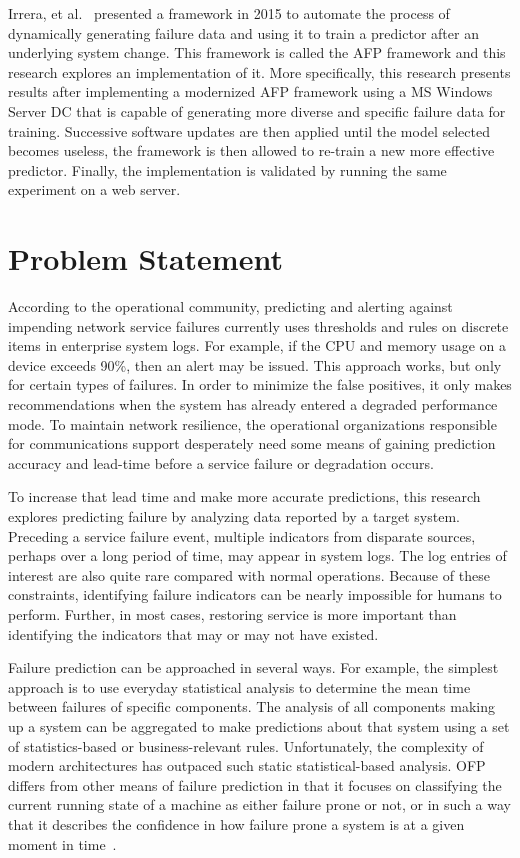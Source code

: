 Irrera, et al.~\cite{irrera2015} presented a framework in 2015 to automate the
process of dynamically generating failure data and using it to train a
predictor after an underlying system change.  This framework is called the
\ac{AFP} framework and this research explores an implementation of it.  More
specifically, this research presents results after implementing a modernized
\ac{AFP} framework using a \ac{MS} Windows Server \ac{DC} that is capable of
generating more diverse and specific failure data for training.  Successive
software updates are then applied until the model selected becomes useless, the
framework is then allowed to re-train a new more effective predictor.  Finally,
the implementation is validated by running the same experiment on a web server.

\section{Problem Statement}
According to the operational community, predicting and alerting against
impending network service failures currently uses thresholds and rules on
discrete items in enterprise system logs.  For example, if the \ac{CPU} and
memory usage on a device exceeds 90\%, then an alert may be issued.  This
approach works, but only for certain types of failures.  In order to minimize
the false positives, it only makes recommendations when the system has already
entered a degraded performance mode.  To maintain network resilience, the
operational organizations responsible for communications support desperately
need some means of gaining prediction accuracy and lead-time before a service
failure or degradation occurs.  

To increase that lead time and make more accurate predictions, this research
explores predicting failure by analyzing data reported by a target system.
Preceding a service failure event, multiple indicators from disparate sources,
perhaps over a long period of time, may appear in system logs.  The log entries
of interest are also quite rare compared with normal operations.  Because of
these constraints, identifying failure indicators can be nearly impossible for
humans to perform.  Further, in most cases, restoring service is more important
than identifying the indicators that may or may not have existed.  

Failure prediction can be approached in several ways. For example, the simplest
approach is to use everyday statistical analysis to determine the mean time
between failures of specific components. The analysis of all components making
up a system can be aggregated to make predictions about that system using a set
of statistics-based or business-relevant rules.  Unfortunately, the complexity
of modern architectures has outpaced such static statistical-based analysis.
\ac{OFP} differs from other means of failure prediction in that it focuses on
classifying the current running state of a machine as either failure prone or
not, or in such a way that it describes the confidence in how failure prone a
system is at a given moment in time~\cite{salfnerSurvey}.

